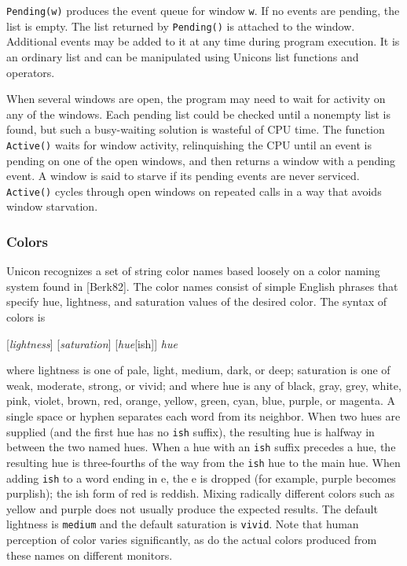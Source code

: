 \texttt{Pending(w)} produces the event queue for window \texttt{w}.
If no events are pending, the list is empty. The list returned by
\texttt{Pending()} is
attached to the window. Additional events may be added to it at any
time during program execution. It is an ordinary list and
can be manipulated using Unicon{\textquotesingle}s list functions and
operators.

When several windows are open, the program may need to wait for activity on
any of the windows. Each pending list could be checked until a nonempty list is
found, but such a busy-waiting solution is wasteful of CPU time. The
function \texttt{Active()} waits for window activity, relinquishing the CPU
until an event is pending on one of the open windows, and then returns
a window with a pending event. A window is said to starve if its
pending events are never serviced. \texttt{Active()} cycles through open
windows on repeated calls in a way that avoids window starvation.

\subsubsection{Colors}

Unicon recognizes a set of string color names based loosely on a color
naming system found in [Berk82]. The color names consist of simple
English phrases that specify hue, lightness, and saturation values of
the desired color. The syntax of colors is

[\textit{lightness}] [\textit{saturation}] [\textit{hue}[ish]]
\textit{hue}

where lightness is one of pale, light, medium, dark, or deep; saturation
is one of weak, moderate, strong, or vivid; and where hue is any of
black, gray, grey, white, pink, violet, brown, red, orange, yellow,
green, cyan, blue, purple, or magenta. A single space or hyphen
separates each word from its neighbor. When two hues are supplied
(and the first hue has no \texttt{ish} suffix), the resulting hue is
halfway in between the two named hues. When a hue with an \texttt{ish} suffix
precedes a hue, the resulting hue is three-fourths of the way
from the \texttt{ish} hue to the main hue. When adding \texttt{ish} to a word
ending in e, the e is dropped (for example, purple becomes purplish); the ish
form of red is reddish. Mixing radically different colors such as
yellow and purple does not usually produce the expected results. The
default lightness is \texttt{medium} and the default saturation is
\texttt{vivid}. Note that human perception of color varies significantly, as
do the actual colors produced from these names on different monitors.

